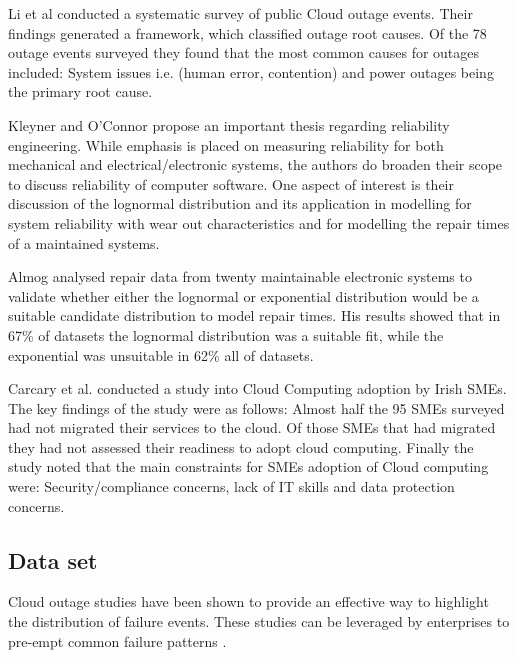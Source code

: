 Li et al \cite{li2013cloud} conducted a systematic survey of public Cloud outage events. Their findings generated a  framework, which classified outage root causes. Of the 78 outage events surveyed they found that the most common causes for outages included: System issues i.e. (human error, contention) and power outages being the primary root cause. \par

Kleyner and O'Connor \cite{o2011practical} propose an important thesis regarding reliability engineering. While emphasis is placed on measuring reliability for both mechanical and electrical/electronic systems, the authors do broaden their scope to discuss reliability of computer software. One aspect of interest is their discussion of the lognormal distribution and its application in modelling for system reliability with wear out characteristics and for modelling the repair times of a maintained systems. \par

Almog \cite{almog1979study} analysed repair data from twenty maintainable electronic systems to validate whether either the lognormal or exponential distribution would be a suitable candidate distribution to model repair times. His results showed that in 67\% of datasets the lognormal distribution was a suitable fit, while the exponential was unsuitable in 62\% all of datasets. \par

Carcary et al. \cite{carcary2014adoption} conducted a study into Cloud Computing adoption by Irish SMEs. The key findings of the study were as follows: Almost half the 95 SMEs surveyed had not migrated their services to the cloud. Of those SMEs that had migrated they had not assessed their readiness to adopt cloud computing. Finally the study noted that the main constraints for SMEs adoption of Cloud computing were: Security/compliance concerns, lack of IT skills and data protection concerns. \par

\subsection{Data set}

Cloud outage studies have been shown to provide an effective way to highlight the distribution of failure events. These studies can be leveraged by enterprises to pre-empt common failure patterns \cite{InfoWorld2015outage} \cite{CRN2015outage}. \par

